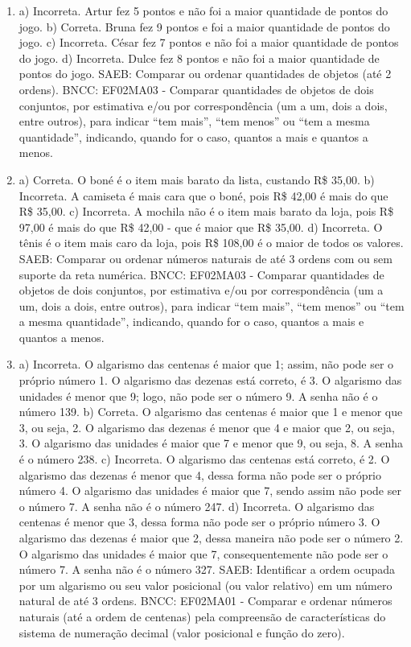 \begin{enumerate}
\item
a) Incorreta. Artur fez 5 pontos e não foi a maior quantidade de pontos do jogo.
b) Correta. Bruna fez 9 pontos e foi a maior quantidade de pontos do jogo.
c) Incorreta. César fez 7 pontos e não foi a maior quantidade de pontos do jogo.
d) Incorreta. Dulce fez 8 pontos e não foi a maior quantidade de pontos do jogo.
SAEB: Comparar ou ordenar quantidades de objetos (até 2 ordens).
BNCC: EF02MA03 - Comparar quantidades de objetos de dois conjuntos, por
estimativa e/ou por correspondência (um a um, dois a dois, entre
outros), para indicar ``tem mais'', ``tem menos'' ou ``tem a mesma
quantidade'', indicando, quando for o caso, quantos a mais e quantos a
menos.

\item
a) Correta. O boné é o item mais barato da lista, custando R\$ 35,00.
b) Incorreta. A camiseta é mais cara que o boné, pois R\$ 42,00 é mais do que R\$ 35,00.
c) Incorreta. A mochila não é o item mais barato da loja, pois R\$ 97,00 é mais do que R\$ 42,00 - que é maior que R\$ 35,00.
d) Incorreta. O tênis é o item mais caro da loja, pois R\$ 108,00 é o maior de todos os valores.
SAEB: Comparar ou ordenar números naturais de até 3 ordens com
ou sem suporte da reta numérica.
BNCC: EF02MA03 - Comparar quantidades de objetos de dois conjuntos, por
estimativa e/ou por correspondência (um a um, dois a dois, entre
outros), para indicar ``tem mais'', ``tem menos'' ou ``tem a mesma
quantidade'', indicando, quando for o caso, quantos a mais e quantos a
menos.

\item
a) Incorreta. O algarismo das centenas é maior que 1; assim, não
pode ser o próprio número 1. O algarismo das dezenas está correto, é 3.
O algarismo das unidades é menor que 9; logo, não pode ser o número 9. A senha não é o número 139.
b) Correta. O algarismo das centenas é maior que 1 e menor que 3, ou
seja, 2. O algarismo das dezenas é menor que 4 e maior que 2, ou seja,
3. O algarismo das unidades é maior que 7 e menor que 9, ou seja, 8. A
senha é o número 238.
c) Incorreta. O algarismo das centenas está correto, é 2. O algarismo
das dezenas é menor que 4, dessa forma não pode ser o próprio número 4.
O algarismo das unidades é maior que 7, sendo assim não pode ser o
número 7. A senha não é o número 247.
d) Incorreta. O algarismo das centenas é menor que 3, dessa forma não
pode ser o próprio número 3. O algarismo das dezenas é maior que 2,
dessa maneira não pode ser o número 2. O algarismo das unidades é maior
que 7, consequentemente não pode ser o número 7. A senha não é o número
327.
SAEB: Identificar a ordem ocupada por um algarismo ou seu valor
posicional (ou valor relativo) em um número natural de até 3 ordens.
BNCC: EF02MA01 - Comparar e ordenar números naturais (até a ordem de
centenas) pela compreensão de características do sistema de numeração
decimal (valor posicional e função do zero).


\end{enumerate}
